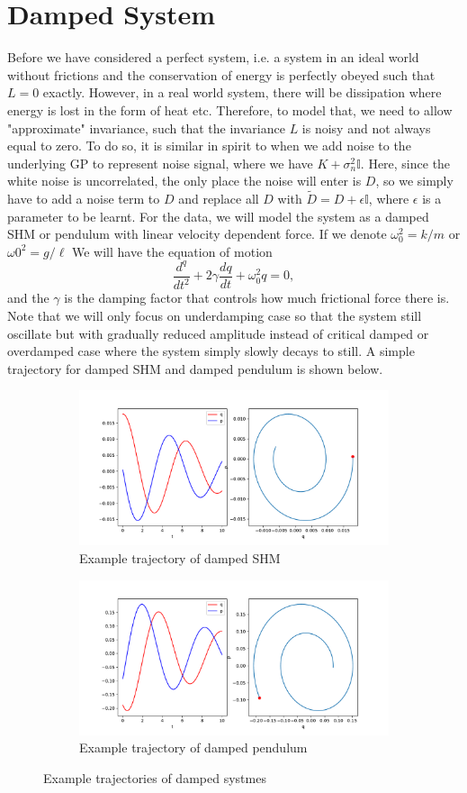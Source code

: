 \documentclass{statsmsc}
\begin{document}
\section{Damped System}
Before we have considered a perfect system, i.e. a system in an ideal world without frictions and the conservation of energy is perfectly obeyed such that $L=0$ exactly.
However, in a real world system, there will be dissipation where energy is lost in the form of heat etc.  
Therefore, to model that, we need to allow "approximate" invariance, such that the invariance $L$ is noisy and not always equal to zero. 
To do so, it is similar in spirit to when we add noise to the underlying GP to represent noise signal, where we have $K+\sigma_n^2 \mathbb{I}$.
Here, since the white noise is uncorrelated, the only place the noise will enter is $D$, so we simply have to add a noise term to $D$ and replace all $D$ with $\tilde{D}=D+\epsilon \mathbb{I}$, where $\epsilon$ is a parameter to be learnt. 
For the data, we will model the system as a damped SHM or pendulum with linear velocity dependent force.
If we denote $\omega_0^2=k/m$ or $\omega0^2=g/\ell$
We will have the equation of motion 
$$
\frac{d^q}{dt^2}+2\gamma\frac{dq}{dt}+\omega_0^2q=0,
$$
and the $\gamma$ is the damping factor that controls how much frictional force there is. 
Note that we will only focus on underdamping case so that the system still oscillate but with gradually reduced amplitude instead of critical damped or overdamped case where the system simply slowly decays to still.
A simple trajectory for damped SHM and damped pendulum is shown below.

\begin{figure}[H]
     \centering
     \begin{subfigure}[b]{\linewidth}
        \centering
        \includegraphics[width=0.5\linewidth]{../codes/figures/damped_shm_trajectory_1D.pdf}
        \caption{Example trajectory of damped SHM}
        \label{fig:damped_shm_trajectory}
     \end{subfigure}
     \hfill
     \begin{subfigure}[b]{\linewidth}
        \centering
        \includegraphics[width=0.5\linewidth]{../codes/figures/damped_pendulum_trajectory_1D.pdf}
        \caption{Example trajectory of damped pendulum}
        \label{fig:damped_pendulum_trajectory}
     \end{subfigure}
        \caption{Example trajectories of damped systmes}
        \label{fig:damped_trajectory}
\end{figure}
\end{document}
